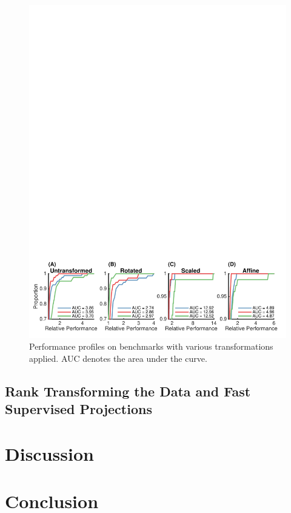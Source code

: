 \documentclass{article}
\begin{document}
\begin{figure}[ht]
\vskip 0.2in
\begin{center}
\centerline{\includegraphics[width=\columnwidth]{../Figures/pdf/Fig4_benchmark}}
\caption{Performance profiles on benchmarks with various transformations applied. AUC denotes the area under the curve.}
\label{benchmark}
\end{center}
\vskip -0.2in
\end{figure}

\subsection{Rank Transforming the Data and Fast Supervised Projections}

\section{Discussion}

\section{Conclusion}

\nocite{langley00}



\end{document}
